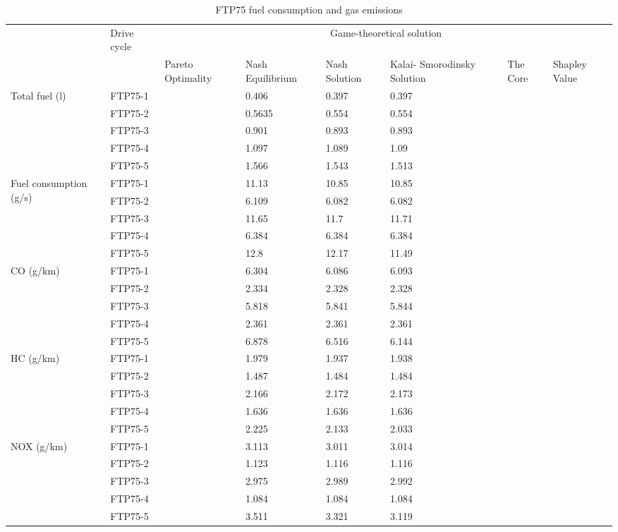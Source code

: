 \begin{table}[h]
\centering
\begin{tabular}{ |p{1.5cm}|p{1.5cm}|p{1.3cm}|p{1.3cm}|p{1.3cm}|p{1.3cm}|p{1.3cm}|p{1.3cm}|} 
 \hline
  \cline{3-8}
   & Drive cycle & \multicolumn{6}{|c|}{Game-theoretical solution} \\
   \cline{3-8}
   & & Pareto Optimality & Nash Equilibrium & Nash Solution & Kalai- Smorodinsky Solution & The Core & Shapley Value\\
 \hline\hline
 \multirow{5}{*}{\parbox{1.5cm}{Total fuel (l)}} 
 & FTP75-1 & & 0.406 & 0.397 & 0.397 & & \\ 
 & FTP75-2 & & 0.5635 & 0.554 & 0.554 & & \\  
 & FTP75-3 & & 0.901 & 0.893 & 0.893 & & \\ 
 & FTP75-4 & & 1.097 & 1.089 & 1.09 & & \\ 
 & FTP75-5 & & 1.566 & 1.543 & 1.513 & &\\ 
 \hline 
 \multirow{5}{*}{\parbox{1.5cm}{Fuel consumption (g/s)}} 
 & FTP75-1 & & 11.13 & 10.85 & 10.85 & &\\ 
 & FTP75-2 & & 6.109 & 6.082 & 6.082 & &\\ 
 & FTP75-3 & & 11.65 & 11.7 & 11.71 & & \\ 
 & FTP75-4 & & 6.384 & 6.384 & 6.384 & &\\ 
 & FTP75-5 & & 12.8 & 12.17 & 11.49 & & \\ 
 \hline 
 
 \multirow{5}{*}{\parbox{1.5cm}{CO (g/km)}} 
 & FTP75-1 & & 6.304 & 6.086 & 6.093 & & \\ 
 & FTP75-2 & & 2.334 & 2.328 & 2.328 & & \\ 
 & FTP75-3 & & 5.818 & 5.841 & 5.844 & & \\ 
 & FTP75-4 & & 2.361 & 2.361 & 2.361 & & \\ 
 & FTP75-5 & & 6.878 & 6.516 & 6.144 & & \\  
 \hline 
 
 \multirow{5}{*}{\parbox{1.5cm}{HC (g/km)}} 
 & FTP75-1 & & 1.979 & 1.937 & 1.938 & & \\ 
 & FTP75-2 & & 1.487 & 1.484 & 1.484 & & \\  
 & FTP75-3 & & 2.166 & 2.172 & 2.173 & & \\ 
 & FTP75-4 & & 1.636 & 1.636 & 1.636 & & \\ 
 & FTP75-5 & & 2.225 & 2.133 & 2.033 & & \\  
 \hline

 \multirow{5}{*}{\parbox{1.5cm}{NOX (g/km)}} 
 & FTP75-1 & & 3.113 & 3.011 & 3.014 & & \\
 & FTP75-2 & & 1.123 & 1.116 & 1.116 & & \\ 
 & FTP75-3 & & 2.975 & 2.989 & 2.992 & & \\ 
 & FTP75-4 & & 1.084 & 1.084 & 1.084 & & \\ 
 & FTP75-5 & & 3.511 & 3.321 & 3.119 & & \\ 
 \hline  
\end{tabular}
\caption{FTP75 fuel consumption and gas emissions}
\label{tab:fuelEmis}
\end{table}



